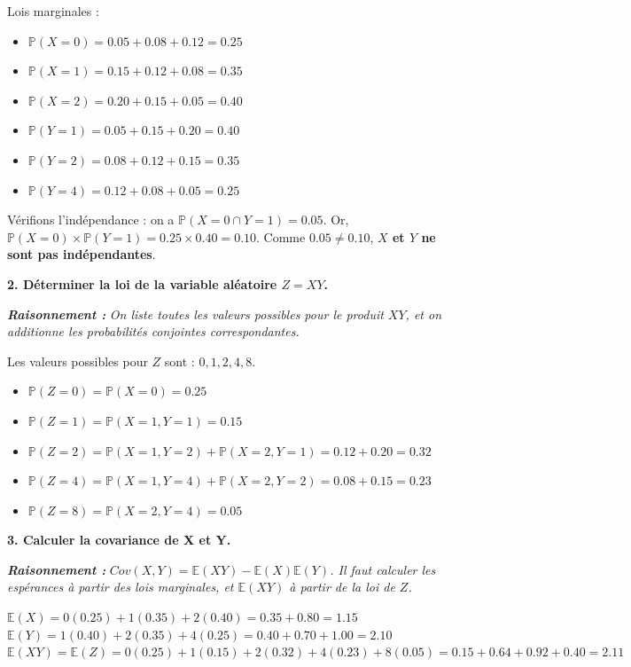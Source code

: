 \documentclass[11pt,a4paper]{article}
\newcommand{\raisonnement}[1]{
    \vspace{0.2cm}
    \noindent\textcolor{blue!70!black}{
        \textbf{\textit{Raisonnement : }} \textit{#1}
    }
    \vspace{0.2cm}
}
\begin{document}
Lois marginales :
\begin{itemize}
    \item $\mathbb{P}(X=0) = 0.05 + 0.08 + 0.12 = \mathbf{0.25}$
    \item $\mathbb{P}(X=1) = 0.15 + 0.12 + 0.08 = \mathbf{0.35}$
    \item $\mathbb{P}(X=2) = 0.20 + 0.15 + 0.05 = \mathbf{0.40}$
\end{itemize}
\begin{itemize}
    \item $\mathbb{P}(Y=1) = 0.05 + 0.15 + 0.20 = \mathbf{0.40}$
    \item $\mathbb{P}(Y=2) = 0.08 + 0.12 + 0.15 = \mathbf{0.35}$
    \item $\mathbb{P}(Y=4) = 0.12 + 0.08 + 0.05 = \mathbf{0.25}$
\end{itemize}
Vérifions l'indépendance : on a $\mathbb{P}(X=0 \cap Y=1) = 0.05$.
Or, $\mathbb{P}(X=0) \times \mathbb{P}(Y=1) = 0.25 \times 0.40 = 0.10$.
Comme $0.05 \neq 0.10$, \textbf{$X$ et $Y$ ne sont pas indépendantes}.

\textbf{2. Déterminer la loi de la variable aléatoire $Z=XY$.}
\raisonnement{On liste toutes les valeurs possibles pour le produit $XY$, et on additionne les probabilités conjointes correspondantes.}

Les valeurs possibles pour $Z$ sont : $0, 1, 2, 4, 8$.
\begin{itemize}
    \item $\mathbb{P}(Z=0) = \mathbb{P}(X=0) = \mathbf{0.25}$
    \item $\mathbb{P}(Z=1) = \mathbb{P}(X=1, Y=1) = \mathbf{0.15}$
    \item $\mathbb{P}(Z=2) = \mathbb{P}(X=1, Y=2) + \mathbb{P}(X=2, Y=1) = 0.12 + 0.20 = \mathbf{0.32}$
    \item $\mathbb{P}(Z=4) = \mathbb{P}(X=1, Y=4) + \mathbb{P}(X=2, Y=2) = 0.08 + 0.15 = \mathbf{0.23}$
    \item $\mathbb{P}(Z=8) = \mathbb{P}(X=2, Y=4) = \mathbf{0.05}$
\end{itemize}

\textbf{3. Calculer la covariance de X et Y.}
\raisonnement{$Cov(X,Y) = \mathbb{E}(XY) - \mathbb{E}(X)\mathbb{E}(Y)$. Il faut calculer les espérances à partir des lois marginales, et $\mathbb{E}(XY)$ à partir de la loi de $Z$.}

$\mathbb{E}(X) = 0(0.25) + 1(0.35) + 2(0.40) = 0.35 + 0.80 = 1.15$ \\
$\mathbb{E}(Y) = 1(0.40) + 2(0.35) + 4(0.25) = 0.40 + 0.70 + 1.00 = 2.10$ \\
$\mathbb{E}(XY) = \mathbb{E}(Z) = 0(0.25) + 1(0.15) + 2(0.32) + 4(0.23) + 8(0.05) = 0.15 + 0.64 + 0.92 + 0.40 = 2.11$
\end{document}
